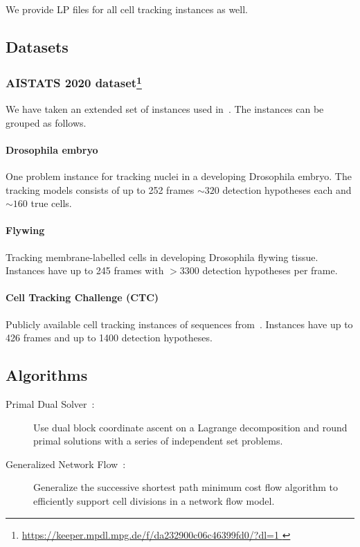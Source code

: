 We provide LP files for all cell tracking instances as well.

\subsection{Datasets}

\subsubsection[AISTATS 2020 dataset]{AISTATS 2020 dataset\footnote{\url{https://keeper.mpdl.mpg.de/f/da232900c06c46399fd0/?dl=1
}}}
We have taken an extended set of instances used in~\cite{haller2020primal}.
The instances can be grouped as follows.

\paragraph{Drosophila embryo}
One problem instance for tracking nuclei in a developing Drosophila embryo.
The tracking models consists of up to 252 frames $\sim 320$ detection hypotheses each and $\sim 160$ true cells.

\paragraph{Flywing}
Tracking membrane-labelled cells in developing Drosophila flywing tissue.
Instances have up to 245 frames with $> 3300$ detection hypotheses per frame.

\paragraph{Cell Tracking Challenge (CTC)}
Publicly available cell tracking instances of sequences from~\cite{ulman2017objective}.
Instances have up to 426 frames and up to 1400 detection hypotheses.

\subsection{Algorithms}
\begin{description}
\item[Primal Dual Solver~\cite{haller2020primal}:] Use dual block coordinate ascent on a Lagrange decomposition and round primal solutions with a series of independent set problems.
\item[Generalized Network Flow~\cite{haubold2016generalized}:] Generalize the successive shortest path minimum cost flow algorithm to efficiently support cell divisions in a network flow model.
\end{description}
